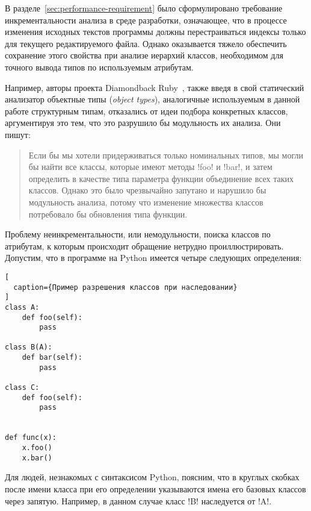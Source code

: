 В разделе~\ref{sec:performance-requirement} было сформулировано требование
инкрементальности анализа в среде разработки, означающее, что в процессе
изменения исходных текстов программы должны перестраиваться индексы только для
текущего редактируемого файла. Однако оказывается тяжело обеспечить сохранение этого
свойства при анализе иерархий классов, необходимом для точного вывода типов по
используемым атрибутам.

Например, авторы проекта Diamondback Ruby~\cite{Furr2009}, также введя в свой
статический анализатор объектные типы (\emph{object types}), аналогичные
используемым в данной работе структурным типам, отказались от идеи
подбора конкретных классов, аргументируя это тем, что это разрушило бы
модульность их анализа. Они пишут:

\begin{quote}
  Если бы мы хотели придерживаться только номинальных типов, мы могли бы найти
  все классы, которые имеют методы !foo! и !bar!, и затем определить в качестве
  типа параметра функции объединение всех таких классов. Однако это было чрезвычайно
  запутано и нарушило бы модульность анализа, потому что изменение множества
  классов потребовало бы обновления типа функции.

\end{quote}

Проблему неинкрементальности, или немодульности, поиска классов по атрибутам, к
которым происходит обращение нетрудно проиллюстрировать. Допустим, что в
программе на Python имеется четыре следующих определения:

\begin{lstlisting}[
  caption={Пример разрешения классов при наследовании}
]
class A:
    def foo(self):
        pass

class B(A):
    def bar(self):
        pass

class C:
    def foo(self):
        pass


def func(x):
    x.foo()
    x.bar()

\end{lstlisting}

Для людей, незнакомых с синтаксисом Python, поясним, что в круглых скобках после
имени класса при его определении указываются имена его базовых классов
через запятую. Например, в данном случае класс !B! наследуется от !A!.

